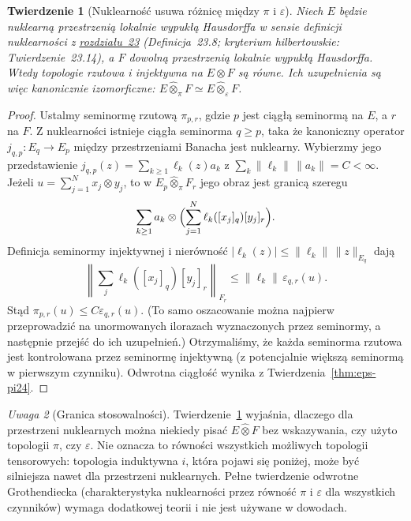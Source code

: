 \documentclass[11pt,a4paper]{article}
\numberwithin{equation}{section}
\theoremstyle{plain}
\newtheorem{twierdzenie}{Twierdzenie}[section]
\theoremstyle{definition}
\theoremstyle{remark}
\newtheorem{uwaga}[twierdzenie]{Uwaga}
\begin{document}
\begin{twierdzenie}[Nuklearność usuwa różnicę między $\pi$ i $\varepsilon$]
\label{thm:nuclear-pi-eps24}
Niech $E$ będzie nuklearną przestrzenią lokalnie wypukłą
Hausdorffa w sensie definicji nuklearności z \hyperref[sec:montel-nuklearne23]{rozdziału~23}
(Definicja~\textup{23.8}; kryterium hilbertowskie: Twierdzenie~\textup{23.14}), a $F$
dowolną przestrzenią lokalnie wypukłą Hausdorffa.
Wtedy topologie rzutowa i injektywna na
$E\otimes F$ są równe. Ich uzupełnienia są więc
kanonicznie izomorficzne:
$E\widehat\otimes_\pi F\simeq E\widehat\otimes_\varepsilon F$.
\end{twierdzenie}
\begin{proof}
Ustalmy seminormę rzutową $\pi_{p,r}$, gdzie $p$ jest
ciągłą seminormą na $E$, a $r$ na $F$. Z nuklearności
istnieje ciągła seminorma $q\ge p$, taka że kanoniczny
operator $j_{q,p}:E_q\to E_p$ między przestrzeniami
Banacha jest nuklearny. Wybierzmy jego przedstawienie
$j_{q,p}(z)=\sum_{k\ge1}\ell_k(z)a_k$ z
$\sum_k\|\ell_k\|\,\|a_k\|=C<\infty$.
Jeżeli $u=\sum_{j=1}^N x_j\otimes y_j$, to w
$E_p\widehat\otimes_\pi F_r$ jego obraz jest granicą
szeregu
\[
 \sum_{k\ge1}a_k\otimes
 \Bigl(\sum_{j=1}^N\ell_k([x_j]_q)[y_j]_r\Bigr).
\]
Definicja seminormy injektywnej i nierówność
$|\ell_k(z)|\le\|\ell_k\|\,\|z\|_{E_q}$ dają
\[
 \left\|\sum_j\ell_k([x_j]_q)[y_j]_r\right\|_{F_r}
 \le\|\ell_k\|\,\varepsilon_{q,r}(u).
\]
Stąd $\pi_{p,r}(u)\le C\varepsilon_{q,r}(u)$.
(To samo oszacowanie można najpierw przeprowadzić na
unormowanych ilorazach wyznaczonych przez seminormy,
a następnie przejść do ich uzupełnień.)
Otrzymaliśmy, że każda seminorma rzutowa jest
kontrolowana przez seminormę injektywną (z potencjalnie
większą seminormą w pierwszym czynniku). Odwrotna
ciągłość wynika z Twierdzenia~\ref{thm:eps-pi24}.
\end{proof}

\begin{uwaga}[Granica stosowalności]
\label{rem:nuclear-characterization24}
Twierdzenie~\ref{thm:nuclear-pi-eps24} wyjaśnia,
dlaczego dla przestrzeni nuklearnych można niekiedy
pisać $E\widehat\otimes F$ bez wskazywania, czy
użyto topologii $\pi$, czy $\varepsilon$.
Nie oznacza to równości wszystkich możliwych topologii
tensorowych: topologia induktywna $i$, która pojawi się
poniżej, może być silniejsza nawet dla przestrzeni nuklearnych.
Pełne twierdzenie odwrotne Grothendiecka (charakterystyka
nuklearności przez równość $\pi$ i $\varepsilon$ dla wszystkich
czynników) wymaga dodatkowej teorii i nie jest używane w dowodach.
\end{uwaga}
\end{document}
